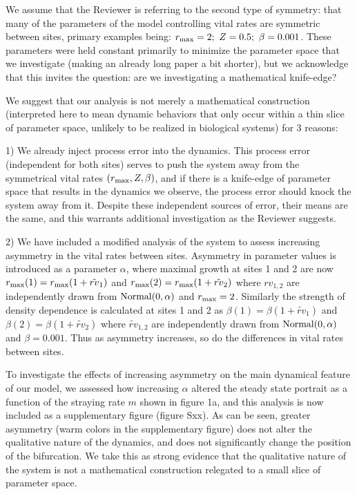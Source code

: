 \documentclass[ucm,12pt]{ucletter}
\begin{document}
\begin{letter}
We assume that the Reviewer is referring to the second type of symmetry: that many of the parameters of the model controlling vital rates are symmetric between sites, primary examples being: $r_{\rm max}=2;~Z=0.5;~\beta=0.001$.
These parameters were held constant primarily to minimize the parameter space that we investigate (making an already long paper a bit shorter), but we acknowledge that this invites the question: are we investigating a mathematical knife-edge?

We suggest that our analysis is not merely a mathematical construction (interpreted here to mean dynamic behaviors that only occur within a thin slice of parameter space, unlikely to be realized in biological systems) for 3 reasons:

1) We already inject process error into the dynamics. This process error (independent for both sites) serves to push the system away from the symmetrical vital rates $(r_{\rm max}, Z, \beta)$, and if there is a knife-edge of parameter space that results in the dynamics we observe, the process error should knock the system away from it. Despite these independent sources of error, their means are the same, and this warrants additional investigation as the Reviewer suggests.

2) We have included a modified analysis of the system to assess increasing asymmetry in the vital rates between sites. Asymmetry in parameter values is introduced as a parameter $\alpha$, where maximal growth at sites 1 and 2 are now  $r_{\rm max}(1)=r_{\rm max}(1+\tilde{rv}_1)$ and $r_{\rm max}(2)=r_{\rm max}(1+\tilde{rv}_2)$ where $rv_{1,2}$ are independently drawn from $\rm{Normal}(0,\alpha)$ and $r_{\rm max}=2$. 
Similarly the strength of density dependence is calculated at sites 1 and 2 as $\beta(1)=\beta(1+\tilde{rv}_1)$ and $\beta(2)=\beta(1+\tilde{rv}_2)$ where $\tilde{rv}_{1,2}$ are independently drawn from $\rm{Normal}(0,\alpha)$ and $\beta=0.001$.
Thus as asymmetry increases, so do the differences in vital rates between sites.

To investigate the effects of increasing asymmetry on the main dynamical feature of our model, we assessed how increasing $\alpha$ altered the steady state portrait as a function of the straying rate $m$ shown in figure 1a, and this analysis is now included as a supplementary figure (figure Sxx). As can be seen, greater asymmetry (warm colors in the supplementary figure) does not alter the qualitative nature of the dynamics, and does not significantly change the position of the bifurcation. We take this as strong evidence that the qualitative nature of the system is not a mathematical construction relegated to a small slice of parameter space.


\end{letter}
\end{document}
